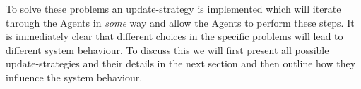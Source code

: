 \medskip 

To solve these problems an update-strategy is implemented which will iterate through the Agents in \textit{some} way and allow the Agents to perform these steps. It is immediately clear that different choices in the specific problems will lead to different system behaviour. To discuss this we will first present all possible update-strategies and their details in the next section and then outline how they influence the system behaviour.


